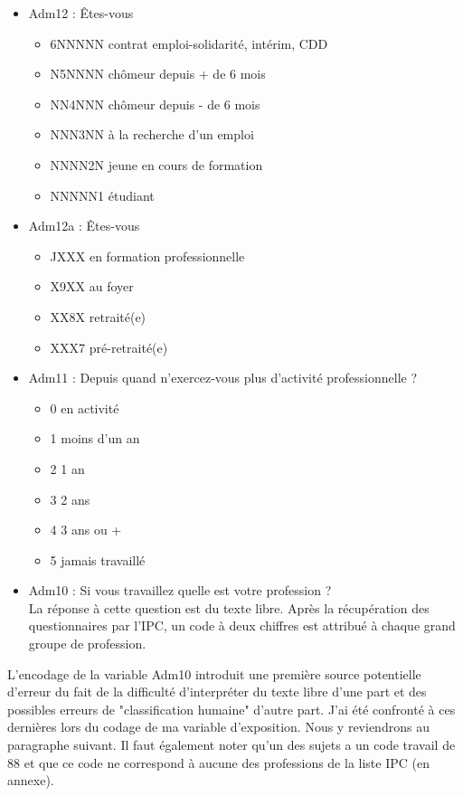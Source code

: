 \documentclass{book}
\begin{document}
\begin{itemize}[label=\textbullet, font=\small \color{red} ]

\item Adm12 : Êtes-vous
\begin{itemize}[label=\textbullet, font=\small \color{blue} ]
\item 6NNNNN  contrat emploi-solidarité, intérim, CDD
\item N5NNNN  chômeur depuis + de 6 mois
\item NN4NNN  chômeur depuis - de 6 mois
\item NNN3NN  à la recherche d'un emploi
\item NNNN2N  jeune en cours de formation
\item NNNNN1  étudiant
\end{itemize}
\bigskip
\item Adm12a : Êtes-vous
\begin{itemize}[label=\textbullet, font=\small \color{blue} ]
\item JXXX  en formation professionnelle
\item X9XX  au foyer
\item XX8X  retraité(e)
\item XXX7  pré-retraité(e)
\end{itemize}
\bigskip
\item Adm11 : Depuis quand n'exercez-vous plus d'activité professionnelle ?
\begin{itemize}[label=\textbullet, font=\small \color{blue} ]
\item 0	en activité
\item 1	moins d'un an
\item 2	1 an
\item 3	2 ans
\item 4	3 ans ou +
\item 5	jamais travaillé
\end{itemize}
\bigskip
\item Adm10 : Si vous travaillez quelle est votre profession ? \\
La réponse à cette question est du texte libre. Après la récupération des questionnaires par l'IPC, un code à deux chiffres est attribué à chaque grand groupe de profession. 
\end{itemize}

\noindent
L'encodage de la variable Adm10 introduit une première source potentielle d'erreur du fait de la difficulté d'interpréter du texte libre d'une part et des possibles erreurs de "classification humaine" d'autre part. J'ai été confronté à ces dernières lors du codage de ma variable d'exposition. Nous y reviendrons au paragraphe suivant. Il faut également noter qu'un des sujets a un code travail de 88 et que ce code ne correspond à aucune des professions de la liste IPC (en annexe).
\end{document}
